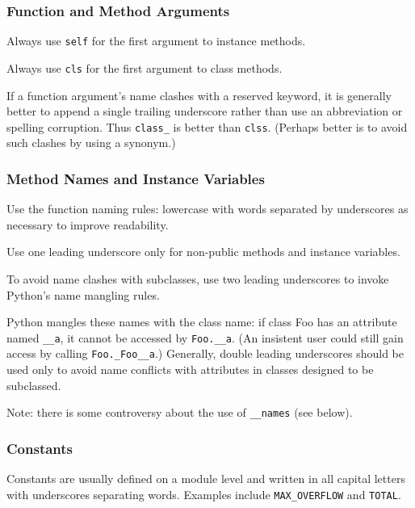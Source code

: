 \documentclass[a4paper,11pt]{article}
\begin{document}
\subsubsection{Function and Method Arguments}
Always use \verb"self" for the first argument to instance methods.
\par
Always use \verb"cls" for the first argument to class methods.
\par
If a function argument’s name clashes with a reserved keyword, it is 
generally better to append a single trailing underscore rather than use an 
abbreviation or spelling corruption. Thus \verb"class_" is better than 
\verb"clss". (Perhaps better is to avoid such clashes by using a synonym.)
\subsubsection{Method Names and Instance Variables}
Use the function naming rules: lowercase with words separated by underscores 
as necessary to improve readability.
\par
Use one leading underscore only for non-public methods and instance variables.
\par
To avoid name clashes with subclasses, use two leading underscores to invoke 
Python’s name mangling rules.
\par
Python mangles these names with the class name: if class Foo has an attribute 
named \verb"__a", it cannot be accessed by \verb"Foo.__a". (An insistent user 
could still gain access by calling \verb"Foo._Foo__a".) Generally, double 
leading underscores should be used only to avoid name conflicts with 
attributes in classes designed to be subclassed.
\par
Note: there is some controversy about the use of \verb"__names" (see below).
\subsubsection{Constants}
Constants are usually defined on a module level and written in all capital 
letters with underscores separating words. Examples include 
\verb"MAX_OVERFLOW" and \verb"TOTAL".
\end{document}
